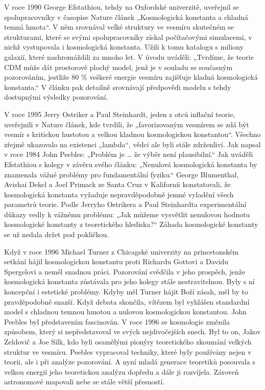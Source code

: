   V roce 1990 George Efstathiou, tehdy na Oxfordské univerzitě, uveřejnil se spolupracovníky v
  časopise Nature článek „Kosmologická konstanta a chladná temná hmota“. V něm srovnával velké
  struktury ve vesmíru skutečném se strukturami, které se svými spolupracovníky získal počítačovými
  simulacemi, v nichž vystupovala i kosmologická konstanta. Užili k tomu katalogu s miliony galaxií,
  které nashromáždili za mnoho let. V úvodu uváděli: „Tvrdíme, že teorie CDM může dát prostorově
  plochý model, jenž je v souladu se současným pozorováním, jestliže 80 \% veškeré energie vesmíru
  zajišťuje kladná kosmologická konstanta.“ V článku pak detailně srovnávají předpovědi modelu s
  tehdy dostupnými výsledky pozorování. 
  
  V roce 1995 Jerry Ostriker a Paul Steinhardt, jeden z otců inflační teorie, uveřejnili v Nature
  článek, kde tvrdili, že „favorizovaným vesmírem se zdá být vesmír s kritickou hustotou a velkou
  kladnou kosmologickou konstantou“. Všechno zřejmě ukazovalo na existenci „lambda“, vědci ale byli
  stále zdrženliví. Jak napsal v roce 1984 John Peebles: „Problém je … že výběr není plausibilní.“
  Jak uváděli Efstathiou s kolegy v závěru svého článku: „Nenulová kosmologická konstanta by
  znamenala vážné problémy pro fundamentální fyziku.“ George Blumenthal, Avishai Dekel a Joel
  Primack ze Santa Cruz v Kalifornii konstatovali, že kosmologická konstanta vyžaduje
  nepravděpodobně jemné vyladění všech parametrů teorie. Podle Jerryho Ostrikera a Paul Steinhardta
  experimentální důkazy vedly k vážnému problému: „Jak můžeme vysvětlit nenulovou hodnotu
  kosmologické konstanty z teoretického hlediska?“ Záhada kosmologické konstanty se už nedala držet
  pod pokličkou. 
  
  Když v roce 1996 Michael Turner z Chicagské univerzity na princetonském setkání hájil
  kosmologickou konstantu proti Richardu Gottovi a Davidu Spergelovi a neměl snadnou práci.
  Pozorování svědčila v jeho prospěch, jenže kosmologická konstanta zůstávala pro jeho kolegy stále
  nestravitelnou. Byly s ní koncepční i estetické problémy. Kdyby měl Turner hájit Boží zásah, měl
  by to pravděpodobně snazší. Když debata skončila, vítězem byl vyhlášen standardní model s chladnou
  temnou hmotou a nulovou kosmologickou konstantou. John Peebles byl představením fascinován. V roce
  1996 se kosmologie změnila způsobem, který si nepředstavoval ve svých nejdivočejších snech. Byl to
  on, Jakov Zeldovič a Joe Silk, kdo byli osamělými pionýry teoretického zkoumání velkých struktur
  ve vesmíru. Peebles vypracoval techniky, které byly používány nejen v teorii, ale i při analýze
  pozorování. A nyní mladá generace teoretiků posouvala s velkou energií jeho teoretickou analýzu
  dopředu a dále ji rozvíjela. Zároveň astronomové mapovali nebe se stále větší přesností. 
  
